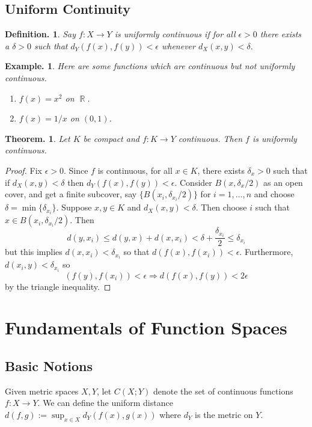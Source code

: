 \documentclass[11pt, a4paper]{memoir}
\DeclareMathOperator{\R}{{\mathbb{R}}}
\theoremstyle{change}
\newtheorem{theorem}{Theorem.}[section]
\theoremstyle{plain}
\theoremstyle{nonumberplain}
\newtheorem{definition}{Definition.}
\newtheorem{example}{Example.}
\newtheorem{proof}{Proof}
\numberwithin{equation}{section}
\begin{document}
\subsection{Uniform Continuity}
\begin{definition}
    Say $f:X\to Y$ is uniformly continuous if for all $\epsilon>0$ there exists a $\delta>0$ such that $d_Y(f(x),f(y))<\epsilon$
    whenever $d_X(x,y)<\delta$.
\end{definition}
\begin{example}
    Here are some functions which are continuous but not uniformly continuous.
    \begin{enumerate}
        \item $f(x)=x^2$ on $\R$.
        \item $f(x)=1/x$ on $(0,1)$.
    \end{enumerate}
\end{example}
\begin{theorem}
    Let $K$ be compact and $f:K\to Y$ continuous. Then $f$ is uniformly continuous.
\end{theorem}
\begin{proof}
    Fix $\epsilon>0$. Since $f$ is continuous, for all $x\in K$, there exists $\delta_x>0$ such that if $d_X(x,y)<\delta$
    then $d_Y(f(x),f(y))<\epsilon$. Consider $B(x,\delta_x/2)$ as an open cover, and get a finite subcover, say $\{B(x_i,\delta_{ x_i}/2)\}$
    for $i=1,\ldots,n$ and choose $\delta=\min\{\delta_{x_i}\}$. Suppose $x,y\in K$ and $d_X(x,y)<\delta$. Then choose $i$
    such that $x\in B(x_i,\delta_{x_i}/2)$. Then
    \[d(y,x_i)\leq d(y,x)+d(x,x_i)<\delta+\frac{\delta_{x_i}}{2}\leq\delta_{x_i}\]
    but this implies $d(x,x_i)<\delta_{x_i}$ so that $d(f(x),f(x_i))<\epsilon$. Furthermore, $d(x_i,y)<\delta_{x_i}$ so
    \[(f(y),f(x_i))<\epsilon\Rightarrow d(f(x),f(y))<2\epsilon\]
    by the triangle inequality.
\end{proof}



\section{Fundamentals of Function Spaces}
\subsection{Basic Notions}
Given metric spaces $X,Y$, let $C(X;Y)$ denote the set of continuous functions $f:X\to Y$.
We can define the uniform distance $d(f,g):=\sup_{x\in X}d_Y(f(x),g(x))$ where $d_Y$ is the metric on $Y$.
\end{document}
